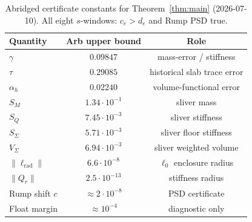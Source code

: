 \documentclass[11pt]{amsart}
\begin{document}
\begin{table}[ht]
\centering
\begin{tabular}{@{}lcc@{}}
\toprule
Quantity & Arb upper bound & Role \\
\midrule
$\gamma$ & $0.09847$ & mass-error / stiffness \\
$\tau$ & $0.29085$ & historical slab trace error \\
$\alpha_h$ & $0.02240$ & volume-functional error \\
$S_M$ & $1.34\cdot 10^{-1}$ & sliver mass \\
$S_Q$ & $7.45\cdot 10^{-3}$ & sliver stiffness \\
$S_\Sigma$ & $5.71\cdot 10^{-3}$ & sliver floor stiffness \\
$V_\Sigma$ & $6.94\cdot 10^{-3}$ & sliver weighted volume \\
$\|\ell_{\mathrm{rad}}\|$ & $6.6\cdot 10^{-8}$ & $\ell_0$ enclosure radius \\
$\|Q_r\|$ & $2.5\cdot 10^{-13}$ & stiffness radius \\
Rump shift $c$ & $\approx 2\cdot 10^{-8}$ & PSD certificate \\
Float margin & $\approx 10^{-4}$ & diagnostic only \\
\bottomrule
\end{tabular}
\caption{Abridged certificate constants for Theorem~\ref{thm:main}
(2026-07-10).  All eight $s$-windows: $c_e>d_e$ and Rump PSD true.}
\label{tab:cert1}
\end{table}
\end{document}

